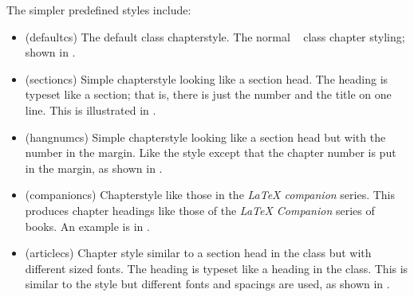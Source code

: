 The simpler predefined styles include:
\begin{itemize}
\item[\cstyle{default}] 
\glossary(defaultcs)%
  {}%
  {The default  class chapterstyle.}
The normal \ltx\  class chapter styling; shown in .

\item[\cstyle{section}] 
\glossary(sectioncs)%
  {}%
  {Simple chapterstyle looking like a section head.}
The heading is typeset like a section; that is, 
there is just the number and the title on one line. This is illustrated
in . 

\item[\cstyle{hangnum}] 
\glossary(hangnumcs)%
  {}%
  {Simple chapterstyle looking like a section head but with the number in the margin.}
Like the  style except that the chapter
number is put in the margin, as shown in . 

\item[\cstyle{companion}]
\glossary(companioncs)%
  {}%
  {Chapterstyle like those in the \textit{LaTeX companion} series.}
 This produces chapter headings like those of the
\textit{LaTeX Companion} series of books. An example is in .

\item[\cstyle{article}]
\glossary(articlecs)%
  {}%
  {Chapter style similar to a section head in the  class but 
   with different
   sized fonts.}
 The heading is typeset like a \cmd{\section}
heading in the  class. This is similar to the 
 style but different fonts and spacings are used,
as shown in .


\end{itemize}
